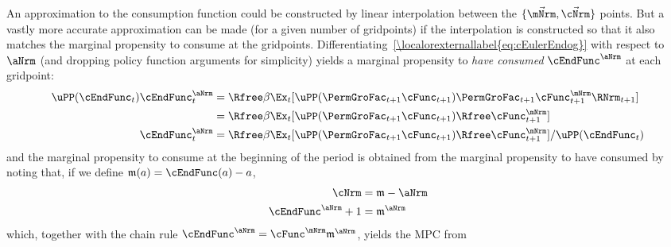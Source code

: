 \documentclass[\econtexRoot/Endo]{subfiles}
\begin{document}
An approximation to the consumption function could be constructed by linear interpolation between the $\{\vec{\mNrm},\vec{\cNrm}\}$ points.  But a vastly more accurate approximation can be made (for a given number of gridpoints) if the interpolation is constructed so that it also matches the marginal propensity to consume at the gridpoints. Differentiating~\eqref{\localorexternallabel{eq:cEulerEndog}} with respect to $\aNrm$ (and dropping policy function arguments for simplicity) yields a marginal propensity to \textit{have consumed} $\cEndFunc^{\aNrm}$ at each gridpoint:
\begin{equation}\begin{gathered}\begin{aligned}
\uPP(\cEndFunc_{t})\cEndFunc_{t}^{\aNrm}  & = \Rfree \beta \Ex_{t}[\uPP(\PermGroFac_{t+1} \cFunc_{t+1})\PermGroFac_{t+1} \cFunc^{\mNrm}_{t+1}\RNrm_{t+1}] \notag
\\  & = \Rfree \beta \Ex_{t}[\uPP(\PermGroFac_{t+1} \cFunc_{t+1}) \Rfree \cFunc^{\mNrm}_{t+1}] \notag
\\ \cEndFunc_{t}^{\aNrm}  & = \Rfree \beta \Ex_{t}[\uPP(\PermGroFac_{t+1}  \cFunc_{t+1}) \Rfree \cFunc^{\mNrm}_{t+1}]/\uPP(\cEndFunc_{t}) \label{eq:MPTHC}
\end{aligned}\end{gathered}\end{equation}
and the marginal propensity to consume at the beginning of the period is obtained from the marginal
propensity to have consumed by noting that, if we define $\mathfrak{m}(a) = \cEndFunc(a)-a$,
\begin{align*}
   \cNrm  & = \mathfrak{m}-\aNrm
\\ \cEndFunc^{\aNrm}+1  & = \mathfrak{m}^{\aNrm}
\end{align*}
which, together with the chain rule $\cEndFunc^{\aNrm}  = \cFunc^{\mNrm}\mathfrak{m}^{\aNrm}$,
yields the MPC from
\end{document}
